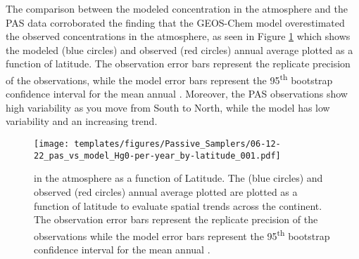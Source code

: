 \begin{flushleft}
 The comparison between the modeled concentration in the atmosphere and the PAS data corroborated the finding that the GEOS-Chem model overestimated the observed concentrations in the atmosphere, as seen in Figure \ref{fig:06-12-22_pas_vs_model_Hg0-per-year_by-latitude_001} which shows the modeled (blue circles) and observed (red circles) annual average \hg plotted as a function of latitude. The observation error bars represent the replicate precision of the observations, while the model error bars represent the 95\textsuperscript{th} bootstrap confidence interval for the mean annual \hg. Moreover, the PAS observations show high variability as you move from South to North, while the model has low variability and an increasing trend.  
\end{flushleft}

\begin{figure}[H]
  \texttt{[image: templates/figures/Passive\_Samplers/06-12-22\_pas\_vs\_model\_Hg0-per-year\_by-latitude\_001.pdf]}
  \caption{\hg in the atmosphere as a function of Latitude. The \on (blue circles) and observed (red circles) annual average \hg plotted are plotted as a function of latitude to evaluate spatial trends across the continent. The observation error bars represent the replicate precision of the observations while the model error bars represent the 95\textsuperscript{th} bootstrap confidence interval for the mean annual \hg.}
  \label{fig:06-12-22_pas_vs_model_Hg0-per-year_by-latitude_001}
  \centering
  
\end{figure}
\FloatBarrier

